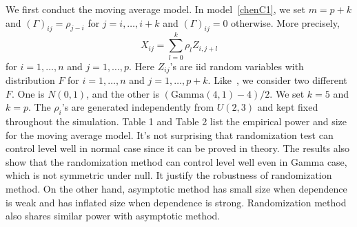 \documentclass[review]{elsarticle}
\theoremstyle{plain}
\theoremstyle{definition}
\theoremstyle{remark}
\begin{document}
We first conduct the moving average model. In model~\eqref{chenC1}, we set $m=p+k$ and ${(\Gamma)}_{ij}=\rho_{j-i}$ for $j=i,\ldots, i+k$ and ${(\Gamma)}_{ij}=0$ otherwise. More precisely,
\begin{equation*}
    X_{ij}=\sum_{l=0}^k \rho_{l}Z_{i,j+l}
\end{equation*}
for $i=1,\ldots, n$ and $j=1,\ldots, p$. Here $Z_{ij}$'s are iid random variables with distribution $F$ for $i=1,\ldots, n$ and $j=1,\ldots, p+k$. 
Like~\cite{Chen2010A}, we consider two different $F$.
One is $N(0,1)$, and the other is $(\textrm{Gamma}(4,1)-4)/2$.
We set $k=5$ and $k=p$.
The $\rho_i$'s are generated independently from $U(2,3)$ and kept fixed throughout the simulation.
Table 1 and Table 2 list the empirical power and size for the moving average model.
It's not surprising that randomization test can control level well in normal case since it can be proved in theory.
The results also show that the randomization method can control level well even in Gamma case, which is not symmetric under null.
It justify the robustness of randomization method.
On the other hand, asymptotic method has small size when dependence is weak and has inflated size when dependence is strong.
Randomization method also shares similar power with asymptotic method. 
\end{document}
